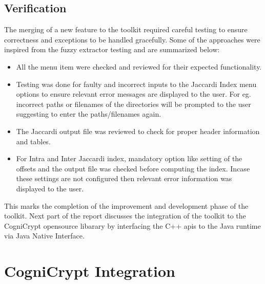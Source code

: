 \subsection{Verification}
The merging of a new feature to the toolkit required careful testing to ensure correctness and exceptions to be handled gracefully. Some of the approaches were inspired from the fuzzy extractor testing and are summarized below:
\begin{itemize}
	\item All the menu item were checked and reviewed for their expected functionality.
	\item Testing was done for faulty and incorrect inputs to the Jaccardi Index menu options to ensure relevant error messages are displayed to the user. For eg. incorrect paths or filenames of the directories will be prompted to the user suggesting to enter the paths/filenames again.
	\item The Jaccardi output file was reviewed to check for proper header information and tables.
	\item For Intra and Inter Jaccardi index, mandatory option like setting of the offsets and the output file was checked before computing the index. Incase these settings are not configured then relevant error information was displayed to the user.
\end{itemize}

This marks the completion of the improvement and development phase of the toolkit. Next part of the report discusses the integration of the toolkit to the CogniCrypt opensource libarary by interfacing the C++ apis to the Java runtime via Java Native Interface.

\section{CogniCrypt Integration}

